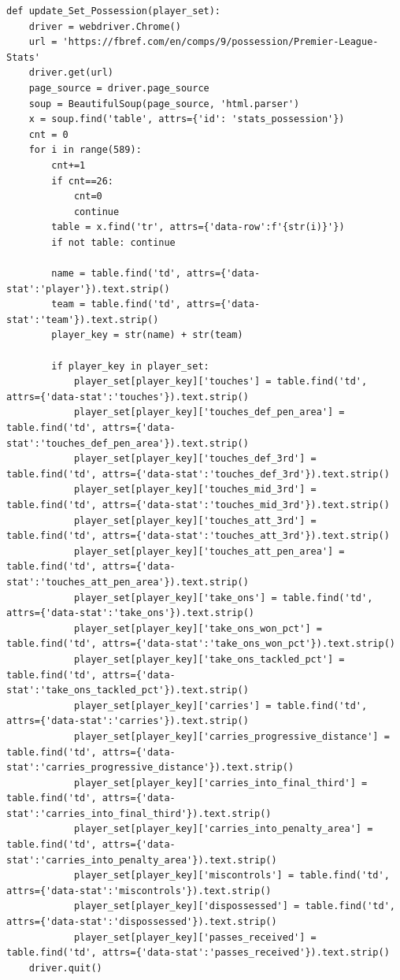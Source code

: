 \documentclass[12pt]{report}
\begin{document}
{\begin{lstlisting}
def update_Set_Possession(player_set):
    driver = webdriver.Chrome()
    url = 'https://fbref.com/en/comps/9/possession/Premier-League-Stats'
    driver.get(url)
    page_source = driver.page_source
    soup = BeautifulSoup(page_source, 'html.parser')
    x = soup.find('table', attrs={'id': 'stats_possession'})
    cnt = 0
    for i in range(589):
        cnt+=1
        if cnt==26:
            cnt=0
            continue
        table = x.find('tr', attrs={'data-row':f'{str(i)}'})
        if not table: continue

        name = table.find('td', attrs={'data-stat':'player'}).text.strip()
        team = table.find('td', attrs={'data-stat':'team'}).text.strip()
        player_key = str(name) + str(team)

        if player_key in player_set:
            player_set[player_key]['touches'] = table.find('td', attrs={'data-stat':'touches'}).text.strip()
            player_set[player_key]['touches_def_pen_area'] = table.find('td', attrs={'data-stat':'touches_def_pen_area'}).text.strip()
            player_set[player_key]['touches_def_3rd'] = table.find('td', attrs={'data-stat':'touches_def_3rd'}).text.strip()
            player_set[player_key]['touches_mid_3rd'] = table.find('td', attrs={'data-stat':'touches_mid_3rd'}).text.strip()
            player_set[player_key]['touches_att_3rd'] = table.find('td', attrs={'data-stat':'touches_att_3rd'}).text.strip()
            player_set[player_key]['touches_att_pen_area'] = table.find('td', attrs={'data-stat':'touches_att_pen_area'}).text.strip()
            player_set[player_key]['take_ons'] = table.find('td', attrs={'data-stat':'take_ons'}).text.strip()
            player_set[player_key]['take_ons_won_pct'] = table.find('td', attrs={'data-stat':'take_ons_won_pct'}).text.strip()
            player_set[player_key]['take_ons_tackled_pct'] = table.find('td', attrs={'data-stat':'take_ons_tackled_pct'}).text.strip()
            player_set[player_key]['carries'] = table.find('td', attrs={'data-stat':'carries'}).text.strip()
            player_set[player_key]['carries_progressive_distance'] = table.find('td', attrs={'data-stat':'carries_progressive_distance'}).text.strip()
            player_set[player_key]['carries_into_final_third'] = table.find('td', attrs={'data-stat':'carries_into_final_third'}).text.strip()
            player_set[player_key]['carries_into_penalty_area'] = table.find('td', attrs={'data-stat':'carries_into_penalty_area'}).text.strip()
            player_set[player_key]['miscontrols'] = table.find('td', attrs={'data-stat':'miscontrols'}).text.strip()
            player_set[player_key]['dispossessed'] = table.find('td', attrs={'data-stat':'dispossessed'}).text.strip()
            player_set[player_key]['passes_received'] = table.find('td', attrs={'data-stat':'passes_received'}).text.strip()
    driver.quit()



\end{lstlisting}}
\end{document}
